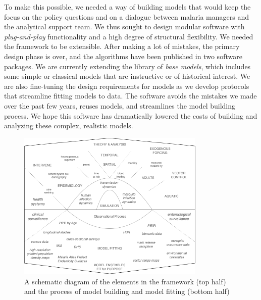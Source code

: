 \documentclass[
]{book}
\begin{document}
To make this possible, we needed a way of building models that would
keep the focus on the policy questions and on a dialogue between malaria managers and the analytical support team. We thus sought to design modular software with \emph{plug-and-play} functionality and a high degree of structural flexibility. We needed the framework to be extensible. After making a lot of mistakes, the primary design phase is over, and the algorithms have been published in two software packages. We are currently extending the library of \emph{base models}, which includes some simple or classical models that are instructive or of historical interest. We are also fine-tuning the design requirements for models as we develop protocols that streamline fitting models to data. The software avoids the mistakes we made over the past few years, reuses models, and streamlines the model building process. We hope this software has dramatically lowered the costs of building and analyzing these complex, realistic models.

\begin{figure}
\centering
\includegraphics[width=0.8\textwidth,height=\textheight]{../RAMP-Model-Library/Figures/ScalableComplexity.png}
\caption{A schematic diagram of the elements in the framework (top half) and the process of model building and model fitting (bottom half)}
\end{figure}
\end{document}
